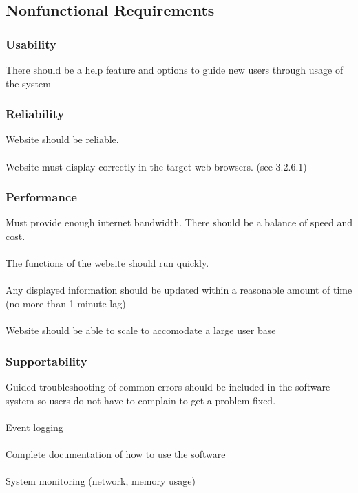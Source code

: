 \documentclass[11pt]{article}
\begin{document}
    \subsection{Nonfunctional Requirements}

        \subsubsection{Usability}
        There should be a help feature and options to guide new users through
        usage of the system

        \subsubsection{Reliability}
            Website should be reliable.\\
            \\
            Website must display correctly in the target web browsers. (see
            3.2.6.1)

            \subsubsection{Performance}
            Must provide enough internet bandwidth. There should be a balance of
            speed and cost.\\
            \\
            The functions of the website should run quickly.\\
            \\
            Any displayed information should be updated within a reasonable amount
            of time (no more than 1 minute lag)\\
            \\
            Website should be able to scale to accomodate a large user base

        \subsubsection{Supportability}
            Guided troubleshooting of common errors should be included in the
            software system so users do not have to complain to get a problem
            fixed.\\
            \\
            Event logging\\
            \\
            Complete documentation of how to use the software\\
            \\
            System monitoring (network, memory usage)
\end{document}
